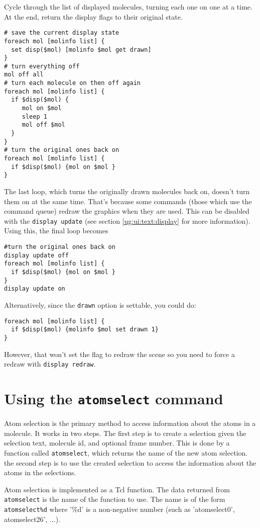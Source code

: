 Cycle through the list of displayed molecules, turning each one on
one at a time.  At the end, return the display flags to their original
state.
\begin{verbatim}
# save the current display state
foreach mol [molinfo list] {
  set disp($mol) [molinfo $mol get drawn]
}
# turn everything off
mol off all
# turn each molecule on then off again
foreach mol [molinfo list] {
  if $disp($mol) {
     mol on $mol
     sleep 1
     mol off $mol
  }
}
# turn the original ones back on
foreach mol [molinfo list] {
  if $disp($mol) {mol on $mol }
}
\end{verbatim}

The last loop, which turns the originally drawn molecules back on,
doesn't turn them on at the same time.  That's because some commands
(those which use the command queue) redraw the graphics when they are
used.  This can be disabled with the {\tt display update} 
 (see
section \ref{ug:ui:text:display} for
more information).  Using this, the final loop becomes
\begin{verbatim}
#turn the original ones back on
display update off
foreach mol [molinfo list] {
  if $disp($mol) {mol on $mol }
}
display update on
\end{verbatim}
Alternatively, since the {\tt drawn} option is settable, you could
do:
\begin{verbatim}
foreach mol [molinfo list] {
  if $disp($mol) {molinfo $mol set drawn 1}
}
\end{verbatim}
However, that won't set the flag to redraw the scene so you need to force a
redraw with {\tt display redraw}.

\section{Using the {\tt atomselect} command}
\label{ug:topic:atomselect}

  Atom selection is the primary method to access information about
the atoms in a molecule.  It works in two steps. The first step is to create a 
selection given the selection text, molecule id, and optional frame 
number. This is done by a function called {\tt atomselect}, which returns the
name of the new atom selection. the second step is to use the created 
selection to access the information about the atoms in the selections.


  Atom selection is implemented as a Tcl function.  The data
returned from {\tt atomselect} is the name of the function to use.
The name is of the form {\tt atomselect\%d} where '\%d' is a non-negative
number (such as 'atomselect0', atomselect26', ...).

